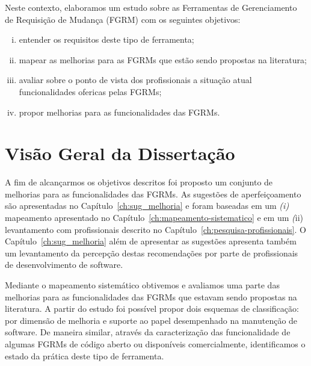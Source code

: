 Neste contexto, elaboramos um estudo sobre as Ferramentas de Gerenciamento de
Requisição de Mudança (FGRM) com os seguintes objetivos:
\begin{enumerate}[(i)]
	\item entender os requisitos deste tipo de ferramenta;
	\item mapear as melhorias para as FGRMs que estão sendo propostas na
		literatura;
	\item avaliar sobre o ponto de vista dos profissionais a
		situação atual funcionalidades ofericas pelas FGRMs\@;
	\item propor melhorias para as funcionalidades das FGRMs\@.
\end{enumerate}


\section{Visão Geral da Dissertação}
\label{sec:intro-visao-geral}

A fim de alcançarmos os objetivos descritos foi proposto um conjunto de
melhorias para as funcionalidades das FGRMs. As sugestões de aperfeiçoamento são
apresentadas no Capítulo~\ref{ch:sug_melhoria} e foram baseadas em um
\textit{(i)} mapeamento apresentado no Capítulo~\ref{ch:mapeamento-sistematico}
e em um \textit(ii) levantamento com profissionais descrito no
Capítulo~\ref{ch:pesquisa-profissionais}. O Capítulo~\ref{ch:sug_melhoria} além
de apresentar as sugestões apresenta também um levantamento da percepção destas
recomendações por parte de profissionais de desenvolvimento de software.

Mediante o mapeamento sistemático obtivemos e avaliamos uma parte das melhorias
para as funcionalidades das FGRMs que estavam sendo propostas na literatura. A
partir do estudo foi possível propor dois esquemas de classificação: por
dimensão de melhoria e suporte ao papel desempenhado na manutenção de software.
De maneira similar, através da caracterização das funcionalidade de algumas
FGRMs de código aberto ou disponíveis comercialmente, identificamos o estado da
prática deste tipo de ferramenta.

